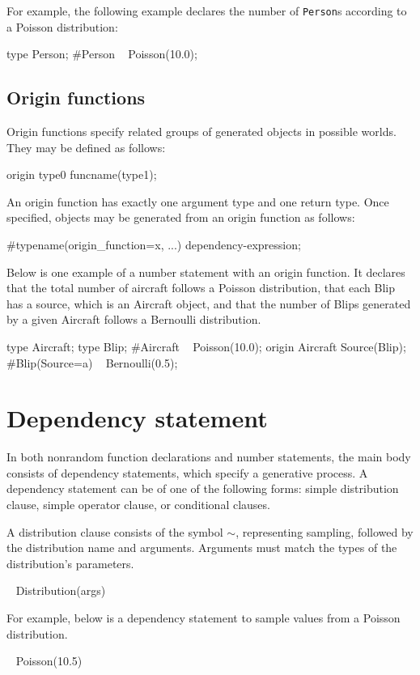 \documentclass[12pt]{article}
\begin{document}
For example, the following example declares the number of \texttt{Person}s according to a Poisson distribution:
\begin{blogcode}
type Person;
#Person ~ Poisson(10.0);
\end{blogcode}

\subsection{Origin functions}
Origin functions specify related groups of generated objects in possible worlds.  They may be defined as follows:
\begin{blogcode}
origin type0 funcname(type1);
\end{blogcode}
An origin function has exactly one argument type and one return type.  Once specified, objects may be generated from an origin function as follows:
\begin{blogcode}
#typename(origin_function=x, ...) dependency-expression;
\end{blogcode}

Below is one example of a number statement with an origin function. It declares that the total number of aircraft follows a Poisson distribution,
that each Blip has a source, which is an Aircraft object, and that the number of Blips generated by a given Aircraft follows a Bernoulli distribution.
\begin{blogcode}
type Aircraft;
type Blip;
#Aircraft ~ Poisson(10.0); 
origin Aircraft Source(Blip);
#Blip(Source=a) ~ Bernoulli(0.5);
\end{blogcode}

\section{Dependency statement}
In both nonrandom function declarations and number statements, the main body consists of dependency statements, which specify a generative process. 
A dependency statement can be of one of the following forms: simple distribution clause, simple operator clause, or conditional clauses.

A distribution clause consists of the symbol $\sim$, representing sampling, followed by the distribution name and arguments.  Arguments must match
the types of the distribution's parameters.
\begin{blogcode}
~ Distribution(args)
\end{blogcode} 
For example, below is a dependency statement to sample values from a Poisson distribution.
\begin{blogcode}
~ Poisson(10.5)
\end{blogcode}
\end{document}
